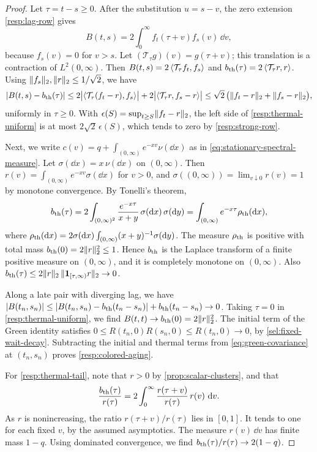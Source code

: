 \begin{proof}
Let $\tau=t-s\ge0$. After the substitution $u=s-v$, the zero extension \eqref{resp:lag-row} gives
\[
 B(t,s)=2\int_0^\infty f_t(\tau+v)f_s(v)\,\dd v,
\]
because $f_s(v)=0$ for $v>s$. Let $(\mathcal T_\tau g)(v)=g(\tau+v)$; this translation is a contraction of $L^2(0,\infty)$. Then $B(t,s)=2\left\langle\mathcal T_\tau f_t,f_s\right\rangle$ and $b_{\rm th}(\tau)=2\left\langle\mathcal T_\tau r,r\right\rangle$. Using $\lVert f_s\rVert_2,\lVert r\rVert_2\le1/\sqrt2$, we have
\[
 |B(t,s)-b_{\rm th}(\tau)|
 \le2\bigl|\left\langle\mathcal T_\tau(f_t-r),f_s\right\rangle\bigr|+2\bigl|\left\langle\mathcal T_\tau r,f_s-r\right\rangle\bigr|
 \le\sqrt2\,\bigl(\lVert f_t-r\rVert_2+\lVert f_s-r\rVert_2\bigr),
\]
uniformly in $\tau\ge0$. With $\epsilon(S)=\sup_{t\ge S}\lVert f_t-r\rVert_2$, the left side of \eqref{resp:thermal-uniform} is at most $2\sqrt2\,\epsilon(S)$, which tends to zero by \cref{resp:strong-row}.

Next, we write $c(v)=q+\int_{(0,\infty)}e^{-xv}\nu(\dd x)$ as in \eqref{eq:stationary-spectral-measure}. Let $\sigma(\dd x)=x\,\nu(\dd x)$ on $(0,\infty)$. Then $r(v)=\int_{(0,\infty)}e^{-xv}\sigma(\dd x)$ for $v>0$, and $\sigma((0,\infty))=\lim_{v\downarrow0}r(v)=1$ by monotone convergence. By Tonelli's theorem,
\[
 b_{\rm th}(\tau)
 =2\int_{(0,\infty)^2}\frac{e^{-x\tau}}{x+y}\,\sigma(\mathop{}\!\mathrm d x)\,\sigma(\mathop{}\!\mathrm d y)
 =\int_{(0,\infty)}e^{-x\tau}\rho_{\rm th}(\mathop{}\!\mathrm d x),
\]
where $\rho_{\rm th}(\mathop{}\!\mathrm d x)=2\sigma(\mathop{}\!\mathrm d x)\int_{(0,\infty)}(x+y)^{-1}\sigma(\mathop{}\!\mathrm d y)$. The measure $\rho_{\rm th}$ is positive with total mass $b_{\rm th}(0)=2\lVert r\rVert_2^2\le1$. Hence $b_{\rm th}$ is the Laplace transform of a finite positive measure on $(0,\infty)$, and it is completely monotone on $(0,\infty)$. Also $b_{\rm th}(\tau)\le2\lVert r\rVert_2\,\lVert\mathbf1_{[\tau,\infty)}r\rVert_2\to0$.

Along a late pair with diverging lag, we have $|B(t_n,s_n)|\le|B(t_n,s_n)-b_{\rm th}(t_n-s_n)|+b_{\rm th}(t_n-s_n)\to0$. Taking $\tau=0$ in \eqref{resp:thermal-uniform}, we find $B(t,t)\to b_{\rm th}(0)=2\lVert r\rVert_2^2$. The initial term of the Green identity satisfies $0\le R(t_n,0)R(s_n,0)\le R(t_n,0)\to0$, by \eqref{sel:fixed-wait-decay}. Subtracting the initial and thermal terms from \eqref{eq:green-covariance} at $(t_n,s_n)$ proves \eqref{resp:colored-aging}.

For \eqref{resp:thermal-tail}, note that $r>0$ by \cref{prop:scalar-clusters}, and that
\[
 \frac{b_{\rm th}(\tau)}{r(\tau)}=2\int_0^\infty\frac{r(\tau+v)}{r(\tau)}\,r(v)\,\mathop{}\!\mathrm d v.
\]
As $r$ is nonincreasing, the ratio $r(\tau+v)/r(\tau)$ lies in $[0,1]$. It tends to one for each fixed $v$, by the assumed asymptotics. The measure $r(v)\,\dd v$ has finite mass $1-q$. Using dominated convergence, we find $b_{\rm th}(\tau)/r(\tau)\to2(1-q)$.
\end{proof}


